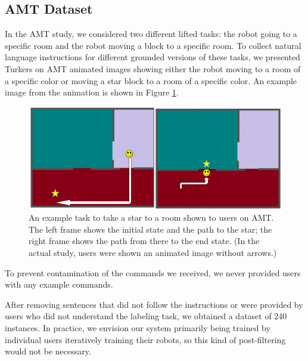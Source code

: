 \documentclass[conference]{IEEEtran}
\begin{document}
\subsection{AMT Dataset}
In the AMT study, we considered two different lifted tasks: the robot going to a specific room and the robot moving a block to a specific room. 
To collect natural language instructions for different grounded versions of these tasks, we presented Turkers on AMT animated images showing either the robot moving to a room of a specific color or moving a star block to a room of a specific color. An example image from the animation is shown in Figure \ref{fig:animation}.
\begin{figure}[tp]
\begin{center}
\includegraphics[width=\columnwidth]{images/map1_2a}
\caption{\small An example task to take a star to a room shown to users on AMT. The left frame shows the initial state and the path to the star; the right frame shows the path from there to the end state. (In the actual study, users were shown an animated image without arrows.)}
\label{fig:animation}
\end{center}
\end{figure}
To prevent contamination of the commands we received, we never provided users with any example commands. 

After removing sentences that did not follow the instructions or were provided by users who did not understand the labeling task,
we obtained a dataset of 240 instances. %
In practice, we envision our system primarily being trained by individual users iteratively training their robots, so this kind of post-filtering would not be necessary.
\end{document}

